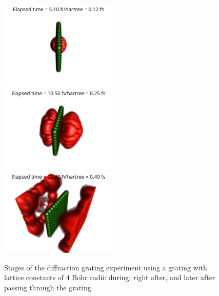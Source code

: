 \begin{figure}
	\begin{center}
		\includegraphics[width=0.5\textwidth]{figures/optical_grid_01.png}
		\includegraphics[width=0.5\textwidth]{figures/optical_grid_02.png}
		\includegraphics[width=0.5\textwidth]{figures/optical_grid_03.png}
		\caption{Stages of the diffraction grating experiment using a grating with lattice constants of $4$ Bohr radii: during, right after, and later after passing through the grating}
		\label{fig:optical_grid_stages}
	\end{center}	
\end{figure}
